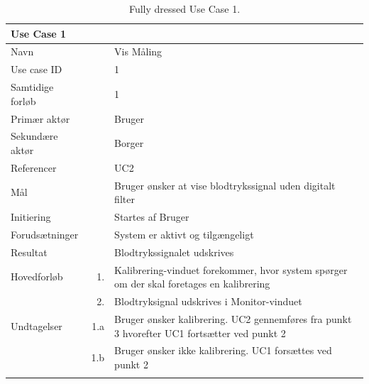 \begin{longtabu} to  %
    {\large \textbf{Use Case 1}} && \\
    \toprule
    Navn &&    Vis Måling\\
    Use case ID &&    1\\
    Samtidige forløb &&    1\\
    Primær aktør &&    Bruger\\
    Sekundære aktør &&	 Borger\\
    Referencer &&    UC2 \\
    Mål &&    Bruger ønsker at vise blodtrykssignal uden digitalt filter\\
    Initiering &&	Startes af Bruger\\
    Forudsætninger &&  System er aktivt og tilgængeligt\\
    Resultat &&		Blodtrykssignalet udskrives                         \\ \midrule
    Hovedforløb &    1. &    Kalibrering-vinduet forekommer, hvor system spørger om der skal foretages en kalibrering\\								
    			&    2. &    Blodtryksignal udskrives i Monitor-vinduet\newline\\ \midrule
                
    Undtagelser &    1.a &   Bruger ønsker kalibrering. UC2 gennemføres fra punkt 3 hvorefter UC1 fortsætter ved punkt 2\\[-1ex]
    			&	 1.b	 &	 Bruger ønsker ikke kalibrering. UC1 forsættes ved punkt 2   \\ \bottomrule
\caption{Fully dressed Use Case 1.}
\label{UC1}
\end{longtabu}


